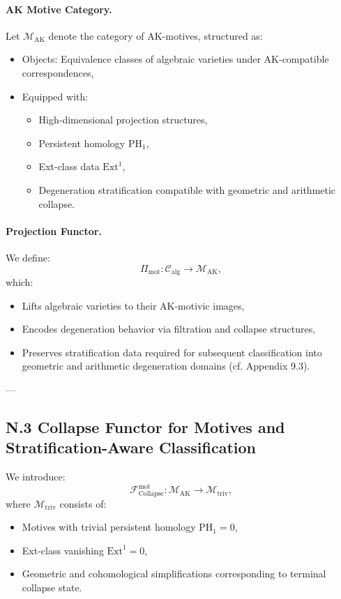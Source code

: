 \documentclass[11pt]{article}
\begin{document}
\paragraph{AK Motive Category.}
Let \( \mathcal{M}_{\mathrm{AK}} \) denote the category of AK-motives, structured as:
\begin{itemize}
  \item Objects: Equivalence classes of algebraic varieties under AK-compatible correspondences,
  \item Equipped with:
  \begin{itemize}
    \item High-dimensional projection structures,
    \item Persistent homology \( \mathrm{PH}_1 \),
    \item Ext-class data \( \mathrm{Ext}^1 \),
    \item Degeneration stratification compatible with geometric and arithmetic collapse.
  \end{itemize}
\end{itemize}

\paragraph{Projection Functor.}
We define:
\[
\Pi_{\mathrm{mot}} : \mathcal{C}_{\mathrm{alg}} \longrightarrow \mathcal{M}_{\mathrm{AK}},
\]
which:
\begin{itemize}
  \item Lifts algebraic varieties to their AK-motivic images,
  \item Encodes degeneration behavior via filtration and collapse structures,
  \item Preserves stratification data required for subsequent classification into geometric and arithmetic degeneration domains (cf. Appendix 9.3).
\end{itemize}

---

\subsection*{N.3 Collapse Functor for Motives and Stratification-Aware Classification}

We introduce:
\[
\mathcal{F}_{\mathrm{Collapse}}^{\mathrm{mot}} : \mathcal{M}_{\mathrm{AK}} \longrightarrow \mathcal{M}_{\mathrm{triv}},
\]
where \( \mathcal{M}_{\mathrm{triv}} \) consists of:
\begin{itemize}
  \item Motives with trivial persistent homology \( \mathrm{PH}_1 = 0 \),
  \item Ext-class vanishing \( \mathrm{Ext}^1 = 0 \),
  \item Geometric and cohomological simplifications corresponding to terminal collapse state.
\end{itemize}
\end{document}
